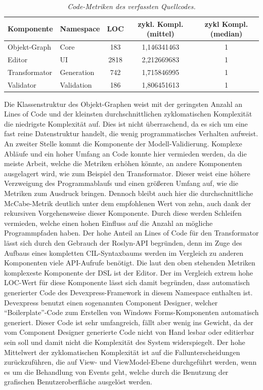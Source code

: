 \begin{table}[hbtp]
\centering
\settowidth{}
\begin{tabulary}{1.0\textwidth}{L|L|C|C|C}
\textbf{Komponente} & \textbf{Namespace} & \textbf{LOC} & \textbf{zykl. Kompl. (mittel)} & \textbf{zykl Kompl. (median)} \\ 
\hline
Objekt-Graph & Core & 183 & 1,146341463 & 1 \\ 
\hline
Editor & UI & 2818 & 2,212669683 & 1 \\ 
\hline
Transformator & Generation & 742 & 1,715846995 & 1 \\ 
\hline
Validator & Validation & 186 & 1,806451613 & 1 \\ 
\end{tabulary}
\caption{\textit{Code-Metriken des verfassten Quellcodes.}}
\label{tab:metrikenGeschriebenerCode}
\end{table}
Die Klassenstruktur des Objekt-Graphen weist mit der geringsten Anzahl an Lines of Code und der kleinsten durchschnittlichen zyklomatischen Komplexität die niedrigste Komplexität auf. Dies ist nicht überraschend, da es sich um eine fast reine Datenstruktur handelt, die wenig programmatisches Verhalten aufweist. An zweiter Stelle kommt die Komponente der Modell-Validierung. Komplexe Abläufe und ein hoher Umfang an Code konnte hier vermieden werden, da die meiste Arbeit, welche die Metriken erhöhen könnte, an andere Komponenten ausgelagert wird, wie zum Beispiel den Transformator. Dieser weist eine höhere Verzweigung des Programmablaufs und einen größeren Umfang auf, wie die Metriken zum Ausdruck bringen. Dennoch bleibt auch hier die durchschnittliche McCabe-Metrik deutlich unter dem empfohlenen Wert von zehn, auch dank der rekursiven Vorgehensweise dieser Komponente. Durch diese werden Schleifen vermieden, welche einen hohen Einfluss auf die Anzahl an mögliche Programmpfaden haben. Der hohe Anteil an Lines of Code für den Transformator lässt sich durch den Gebrauch der Roslyn-API begründen, denn im Zuge des Aufbaus eines kompletten CIL-Syntaxbaums werden im Vergleich zu anderen Komponenten  viele API-Aufrufe benötigt. 
\newline
Die laut den oben stehenden Metriken komplexeste Komponente der DSL ist der Editor. Der im Vergleich extrem hohe LOC-Wert für diese Komponente lässt sich damit begründen, dass automatisch generierter Code des Devexpress-Framework in diesem Namespace enthalten ist. Devexpress benutzt einen sogenannten Component Designer, welcher ``Boilerplate''-Code zum Erstellen von Windows Forms-Komponenten automatisch generiert. Dieser Code ist sehr umfangreich, fällt aber wenig ins Gewicht, da der vom Component Designer generierte Code nicht von Hand lesbar oder editierbar sein soll und damit nicht die Komplexität des System widerspiegelt. Der hohe Mittelwert der zyklomatischen Komplexität ist auf die Fallunterscheidungen zurückzuführen, die auf View- und ViewModel-Ebene durchgeführt werden, wenn es um die Behandlung von Events geht, welche durch die Benutzung der grafischen Benutzeroberfläche ausgelöst werden.
